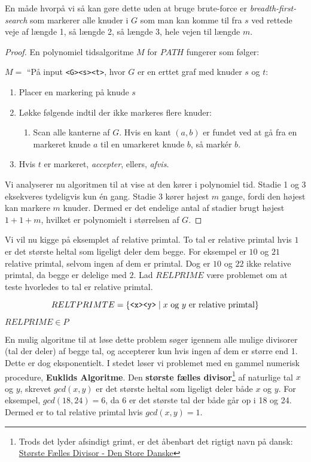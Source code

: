 En måde hvorpå vi så kan gøre dette uden at bruge brute-force er \textit{breadth-first-search} som markerer alle knuder i $G$ som man kan komme til fra $s$ ved rettede veje af længde 1, så længde 2, så længde 3, hele vejen til længde $m$.

\begin{proof}
	En polynomiel tidsalgoritme $M$ for $PATH$ fungerer som følger:

	$M =$ ``På input \texttt{<G><s><t>}, hvor $G$ er en erttet graf med knuder $s$ og $t$:
	\begin{enumerate}
		\item Placer en markering på knude $s$
		\item Løkke følgende indtil der ikke markeres flere knuder:
		      \begin{enumerate}
			      \item Scan alle kanterne af $G$. Hvis en kant $(a,b)$ er fundet ved at gå fra en markeret knude $a$ til en umarkeret knude $b$, så markér $b$.
		      \end{enumerate}
		\item Hvis $t$ er markeret, \textit{accepter}, ellers, \textit{afvis}.
	\end{enumerate}

	Vi analyserer nu algoritmen til at vise at den kører i polynomiel tid. Stadie 1 og 3 eksekveres tydeligvis kun én gang. Stadie 3 kører højest $m$ gange, fordi den højest kan markere $m$ knuder. Dermed er det endelige antal af stadier brugt højest $1 + 1 + m$, hvilket er polynomielt i størrelsen af $G$.
\end{proof}

Vi vil nu kigge på eksemplet af relative primtal. To tal er relative primtal hvis $1$ er det største heltal som ligeligt deler dem begge. For eksempel er $10$ og $21$ relative primtal, selvom ingen af dem er primtal. Dog er $10$ og $22$ ikke relative primtal, da begge er delelige med $2$. Lad $RELPRIME$ være problemet om at teste hvorledes to tal er relative primtal.

\begin{equation*}
	RELTPRIMTE = \{\text{\texttt{<x><y>}} \mid x \text{ og } y \text{ er relative primtal}\}
\end{equation*}

\begin{theorem}
	$RELPRIME \in P$
\end{theorem}

En mulig algoritme til at løse dette problem søger igennem alle mulige divisorer (tal der deler) af begge tal, og accepterer kun hvis ingen af dem er større end 1. Dette er dog eksponentielt. I stedet løser vi problemet med en gammel numerisk procedure, \textbf{Euklids Algoritme}. Den \textbf{største fælles divisor}\footnote{Trods det lyder afsindigt grimt, er det åbenbart det rigtigt navn på dansk: \href{https://denstoredanske.lex.dk/st\%C3\%B8rste_f\%C3\%A6lles_divisor}{Største Fælles Divisor - Den Store Danske}} af naturlige tal $x$ og $y$, skrevet $gcd(x,y)$ er det største heltal som ligeligt deler både $x$ og $y$. For eksempel, $gcd(18,24) = 6$, da $6$ er det største tal der både går op i 18 og 24. Dermed er to tal relative primtal hvis $gcd(x,y) = 1$.

